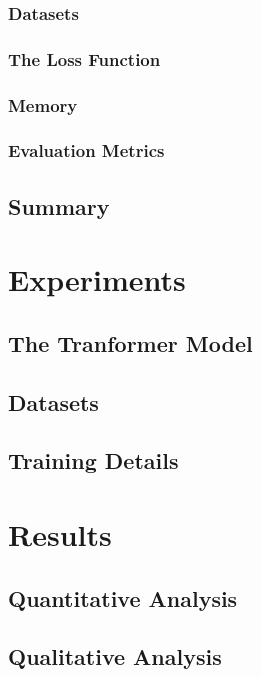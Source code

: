 \documentclass[12pt]{article}
\begin{document}
\subsubsection{Datasets}
\subsubsection{The Loss Function}
\subsubsection{Memory}
\subsubsection{Evaluation Metrics} \label{sssec:metrics}

\subsection{Summary} \label{ssec:summary}
    

\newpage\section{Experiments} \label{sec:experiments}
\subsection{The Tranformer Model} \label{ssec:41}
\subsection{Datasets} \label{ssec:42}
\subsection{Training Details} \label{ssec:43}

\newpage\section{Results} \label{sec:results}
\subsection{Quantitative Analysis} \label{ssec:51}
\subsection{Qualitative Analysis} \label{ssec:52}
\end{document}
